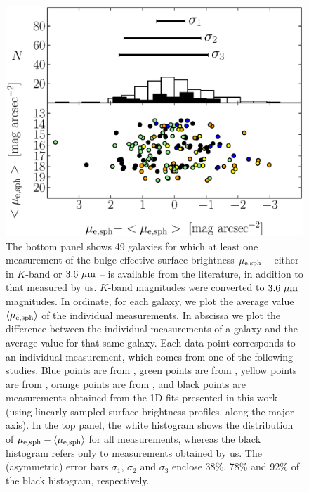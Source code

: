 \documentclass[preprint2]{emulateapj}
\begin{document}
\begin{figure}%
\begin{center}
\includegraphics[width=1.1\columnwidth]{images/comparison_all_mu_e.eps} 
\caption{The bottom panel shows 49 galaxies for which at least one measurement 
of the bulge effective surface brightness $\mu_{\rm e,sph}$ -- either in $K$-band or $3.6~\rm \mu m$ -- is available 
from the literature, in addition to that measured by us. 
$K$-band magnitudes were converted to $3.6~\rm \mu m$ magnitudes.
In ordinate, for each galaxy, we plot the average value $\langle \mu_{\rm e,sph} \rangle$ 
of the individual measurements. 
In abscissa we plot the difference between the individual measurements of a galaxy 
and the average value for that same galaxy.
Each data point corresponds to an individual measurement, 
which comes from one of the following studies. 
Blue points are from \cite{laurikainen2010}, green points are from \cite{sani2011}, 
yellow points are from \cite{vika2012}, 
orange points are from \cite{lasker2014data},
and black points are measurements obtained from the 1D fits presented in this work 
(using linearly sampled surface brightness profiles, along the major-axis).
In the top panel, the white histogram shows the distribution of $\mu_{\rm e,sph} - \langle \mu_{\rm e,sph} \rangle$ 
for all measurements, 
whereas the black histogram refers only to measurements obtained by us.
The (asymmetric) error bars $\sigma_1$, $\sigma_2$ and $\sigma_3$ enclose 38\%, 78\% and 92\% 
of the black histogram, respectively.}
\label{fig:compmue}
\end{center}
\end{figure}
\end{document}
